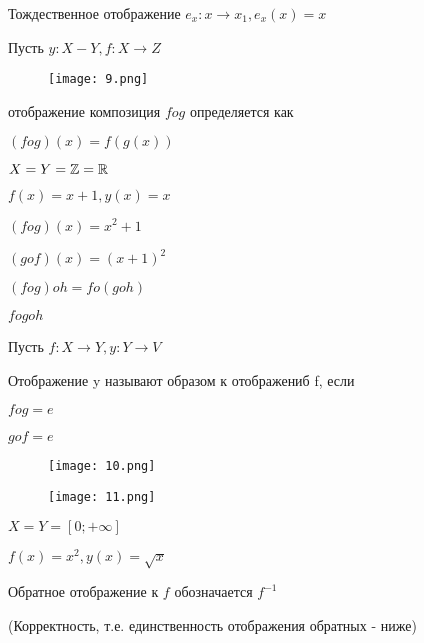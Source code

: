 \begin{definition}
    Тождественное отображение
    $e_x: x \rightarrow x_1, e_x(x) = x$
\end{definition}

\begin{definition}
    Пусть $y: X - Y, f: X \rightarrow Z$

    \begin{figure}[H]
        \centering
        \texttt{[image: 9.png]}
        
        
        \label{fig:9}
    \end{figure}

    отображение композиция $f o g$ определяется как

    $(f o g)(x) = f(g(x))$

    \begin{eg}
        $X = Y = \mathbb{Z} = \mathbb{R}$

        $f(x) = x + 1, y(x) = x$
        
        $(f o g)(x) = x^2 + 1$
        
        $(g o f)(x) = (x + 1)^2$ 
    \end{eg}

    \begin{remark}
        $(f o g) oh = fo (g o h)$
    \end{remark}

    \begin{notation}
        $f o g o h$
    \end{notation}
\end{definition}

\begin{definition}
    Пусть $f : X \rightarrow Y, y : Y \rightarrow V$

    Отображение y называют образом к отображениб f, если

    

    $f o g = e$ 

    $g o f = e$

    \begin{figure}[H]
        \centering
        \texttt{[image: 10.png]}
        
        
        \label{fig:10}
    \end{figure}

    \begin{figure}[H]
        \centering
        \texttt{[image: 11.png]}
        
        
        \label{fig:11}
    \end{figure}

    \begin{eg}
        $X = Y = [0; +\infty]$

        $f(x) = x^2, y(x) = \sqrt{x}$
    \end{eg}

    \begin{definition}
        Обратное отображение к $f$ обозначается $f^{-1}$

        (Корректность, т.е. единственность отображения обратных - ниже)
    \end{definition}
\end{definition}

